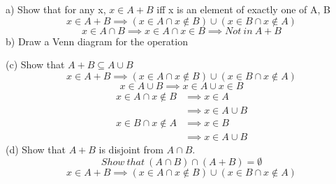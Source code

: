 \documentclass{article}
\begin{document}
a) Show that for any x, $x \in A + B$ iff x is an element of exactly one of A, B
\begin{equation*}
    x \in A + B \implies (x \in A \cap x \notin B) \cup (x \in B \cap x \notin A)
\end{equation*}
\begin{equation*}
    x \in A \cap B \implies x \in A \cap x \in B \implies Not\ in\ A + B
\end{equation*}
b) Draw a Venn diagram for the operation\\
\begin{center}
\end{center}
(c) Show that $A+B \subseteq A \cup B$ \\
\begin{equation*}
    x \in A+B \implies (x \in A \cap x \notin B) \cup (x \in B \cap x \notin A)
\end{equation*}
\begin{equation*}
    x \in A \cup B \implies x \in A \cup x \in B
\end{equation*}
\begin{align*}
    x \in A \cap x \notin B &\implies x \in A\\
                   &\implies x \in A \cup B
\end{align*}
\begin{align*}
    x \in B \cap x \notin A &\implies x \in B\\
                   &\implies x \in A \cup B
\end{align*}
(d) Show that $A+B$ is disjoint from $A \cap B$.\\
\begin{equation*}
    Show\ that\ (A \cap B) \cap (A+B) = \emptyset
\end{equation*}
\begin{equation*}
    x \in A+B \implies (x \in A \cap x \notin B) \cup (x \in B \cap x \notin A)
\end{equation*}
\end{document}

